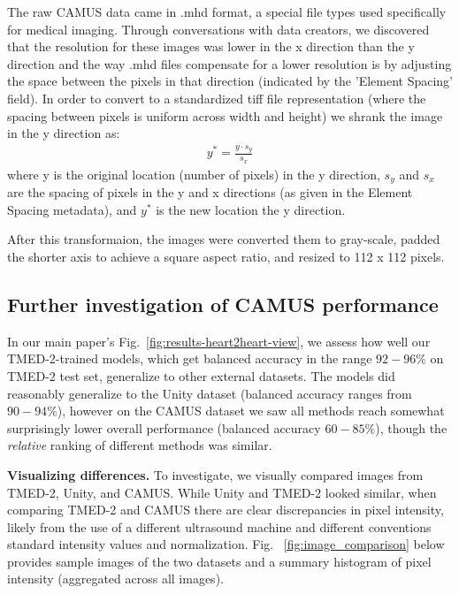 The raw CAMUS data came in .mhd format, a special file types used specifically for medical imaging. Through conversations with data creators, we discovered that the resolution for these images was lower in the x direction than the y direction and the way .mhd files compensate for a lower resolution is by adjusting the space between the pixels in that direction (indicated by the 'Element Spacing' field).
In order to convert to a standardized tiff file representation (where the spacing between pixels is uniform across width and height) we shrank the image in the y direction as:
\begin{align}
	y^* = \frac{y \cdot s_y}{s_x}
	\label{eq:camus_shrink_y}
\end{align}
where y is the original location (number of pixels) in the y direction, $s_y$ and $s_x$ are the spacing of pixels in the y and x directions (as given in the Element Spacing metadata), and $y^*$ is the new location the y direction. 

After this transformaion, the images were converted them to gray-scale, padded the shorter axis to achieve a square aspect ratio, and resized to 112 x 112 pixels. 


\subsection{Further investigation of CAMUS performance}
In our main paper's Fig.~\ref{fig:results-heart2heart-view}, we assess how well our TMED-2-trained models, which get balanced accuracy in the range $92-96\%$ on TMED-2 test set, generalize to other external datasets.
The models did reasonably generalize to the Unity dataset (balanced accuracy ranges from $90-94\%$), however on the CAMUS dataset we saw all methods reach somewhat surprisingly lower overall performance (balanced accuracy $60-85\%$), though the \emph{relative} ranking of different methods was similar.

\textbf{Visualizing differences.}
To investigate, we visually compared images from TMED-2, Unity, and CAMUS.
While Unity and TMED-2 looked similar, when comparing TMED-2 and CAMUS there are clear discrepancies in pixel intensity, likely from the use of a different ultrasound machine and different conventions standard intensity values and normalization.
Fig. ~\ref{fig:image_comparison} below provides sample images of the two datasets and a summary histogram of pixel intensity (aggregated across all images).

